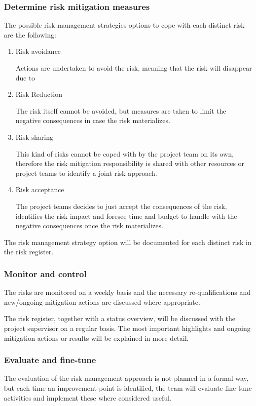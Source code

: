 \subsubsection{Determine risk mitigation measures}
The possible risk management strategies options to cope with each distinct risk are the following:
\begin{enumerate}
	\item Risk avoidance

	Actions are undertaken to avoid the risk, meaning that the risk will disappear due to 
	\item Risk Reduction

	The risk itself cannot be avoided, but measures are taken to limit the negative consequences in case the risk materializes.
	\item Risk sharing

	This kind of risks cannot be coped with by the project team on its own, therefore the risk mitigation responsibility is shared with other resources or project teams to identify a joint risk approach.
	\item Risk acceptance

	The project teams decides to just accept the consequences of the risk, identifies the risk impact and foresee time and budget to handle with the negative consequences once the risk materializes.
\end {enumerate}

The risk management strategy option will be documented for each distinct risk in the risk register.

\subsubsection{Monitor and control}
The risks are monitored on a weekly basis and the necessary re-qualifications and new/ongoing mitigation actions are discussed where appropriate.

The risk register, together with a status overview, will be discussed with the project supervisor on a regular basis. 
The most important highlights and ongoing mitigation actions or results will be explained in more detail.

\subsubsection{Evaluate and fine-tune}
The evaluation of the risk management approach is not planned in a formal way, but each time an improvement point is identified, the team will evaluate fine-tune activities and implement these where considered useful.
